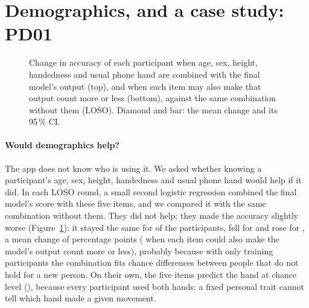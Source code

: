 \section{Demographics, and a case study: PD01}\label{sec:secondary}

\begin{figure}[tbp]
\centering
\begin{minipage}[c]{0.49\linewidth}\centering{}\end{minipage}\hfill
\begin{minipage}[c]{0.48\linewidth}
\caption{Change in accuracy of each participant when age, sex, height, handedness and usual phone hand are combined
with the final model's output (top), and when each item may also make that output count more or less (bottom),
against the same combination without them (LOSO). Diamond and bar: the mean change and its 95\,\% CI.}
\label{fig:demo}
\end{minipage}
\end{figure}

\paragraph{Would demographics help?} The app does not know who is using it. We asked whether knowing a participant's
age, sex, height, handedness and usual phone hand would help if it did. In each LOSO round, a small second logistic
regression combined the final model's score with these five items, and we compared it with the same combination
without them. They did not help; they made the accuracy slightly worse (Figure~\ref{fig:demo}): it stayed the same
for  of the  participants, fell for  and rose for
, a mean change of  percentage points ( when each item
could also make the model's output count more or less), probably because with only  training
participants the combination fits chance differences between people that do not hold for a new person. On their own,
the five items predict the hand at chance level (), because every participant used both hands: a
fixed personal trait cannot tell which hand made a given movement.


